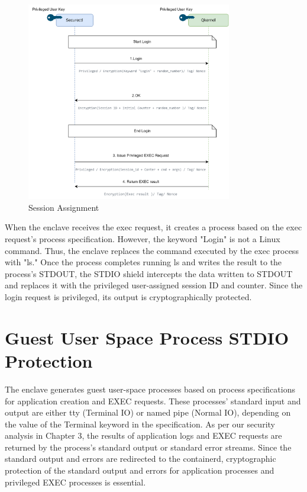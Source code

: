 \begin{figure}[H]
    \centering
    \includegraphics[width=0.8\textwidth]{images/session_base_auth.png}
    \caption[Session Assignment]{Session Assignment}
    \label{fig:session_base_auth}
\end{figure}

When the enclave receives the exec request, it creates a process based on the exec request's process specification. However, the keyword "Login" is not a Linux command. Thus, the enclave replaces the command executed by the exec process with "ls." 
Once the process completes running ls and writes the result to the process's STDOUT, the STDIO shield intercepts the data written to STDOUT and replaces it with the privileged user-assigned session ID and counter. Since the login request is 
privileged, its output is cryptographically protected.


\section{Guest User Space Process STDIO Protection}
\label{sec:design_STDIO_PROTECTION}
The enclave generates guest user-space processes based on process specifications for application creation and EXEC requests. These processes' standard input and output are either tty (Terminal IO) or named pipe (Normal IO), depending on the value of 
the Terminal keyword in the specification. As per our security analysis in Chapter 3, the results of application logs and EXEC requests are returned by the process's standard output or standard error streams. Since the standard output and errors 
are redirected to the containerd, cryptographic protection of the standard output and errors for application processes and privileged EXEC processes is essential.

